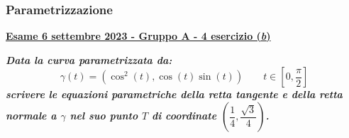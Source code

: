 \documentclass[a4paper]{article}
\newcommand{\definition}[1]{\textcolor{Red3}{\textbf{#1}}}
\newcommand{\example}[1]{\textcolor{Green4}{\textbf{#1}}}
\begin{document}
	\subsubsection{Parametrizzazione}
	\begin{flushleft}
		\label{exam: esame 06 settembre 2023 - Gruppo A - 4 esercizio (b)}
		\hypertarget{
			exam: esame 06 settembre 2023 - Gruppo A - 4 esercizio (b)
		}{
			\definition{\underline{Esame 6 settembre 2023 - Gruppo A - 4 esercizio (\emph{b})}}
		}
	\end{flushleft}
	\example{\emph{Data la curva parametrizzata da:}
	\begin{equation*}
		\gamma\left(t\right) = \left(\cos^{2}\left(t\right), \cos\left(t\right) \sin\left(t\right)\right) \hspace{2em} t \in \left[0, \frac{\pi}{2}\right]
	\end{equation*}
	\emph{scrivere le equazioni parametriche della retta tangente e della retta normale a $\gamma$ nel suo punto $T$ di coordinate $\left(\dfrac{1}{4}, \dfrac{\sqrt{3}}{4}\right)$.}}\newline
\end{document}
